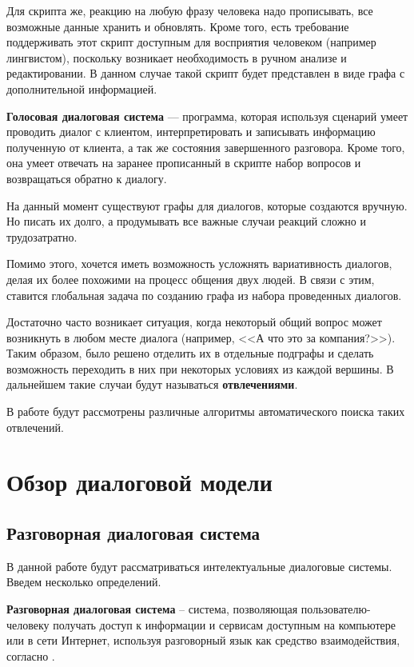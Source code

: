 \documentclass[times,specification,annotation]{itmo-student-thesis}
\begin{document}
	Для скрипта же, реакцию на любую фразу человека надо прописывать, все возможные данные хранить и обновлять. Кроме того, есть требование поддерживать этот скрипт доступным для восприятия человеком (например лингвистом), поскольку возникает необходимость в ручном анализе и редактировании. В данном случае такой скрипт будет представлен в виде графа с дополнительной информацией.
	
	\textbf{Голосовая диалоговая система} — программа, которая используя сценарий умеет проводить диалог с клиентом, интерпретировать и записывать  информацию полученную от клиента, а так же состояния завершенного разговора. Кроме того, она умеет отвечать на заранее прописанный в скрипте набор вопросов и возвращаться обратно к диалогу.
	
	На данный момент существуют графы для диалогов, которые создаются вручную. Но писать их долго, а продумывать все важные случаи реакций сложно и трудозатратно. 
	
	Помимо этого, хочется иметь возможность усложнять вариативность диалогов, делая их более похожими на процесс общения двух людей. В связи с этим, ставится глобальная задача по созданию графа из набора проведенных диалогов. 
	
	Достаточно часто возникает ситуация, когда некоторый общий вопрос может возникнуть в любом месте диалога (например, <<А что это за компания?>>). Таким образом, было решено отделить их в отдельные подграфы и сделать возможность переходить в них при некоторых условиях из каждой вершины. В дальнейшем такие случаи будут называться \textbf{отвлечениями}.
	
	В работе будут рассмотрены различные алгоритмы автоматического поиска таких отвлечений.
	
	\chapter{Обзор диалоговой модели}
	\section{Разговорная диалоговая система}
	В данной работе будут рассматриваться интелектуальные диалоговые системы. Введем несколько определений.
	
	\textbf{Разговорная диалоговая система} -- система, позволяющая пользователю-человеку получать доступ к информации и сервисам доступным на компьютере или в сети Интернет, используя разговорный язык как средство взаимодействия, согласно \cite{jokinen2010spoken}.
	
\end{document}
